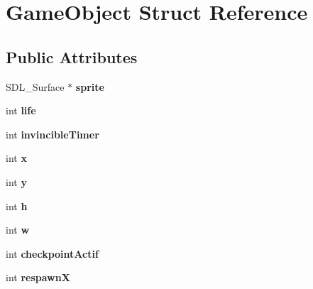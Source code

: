 \hypertarget{structGameObject}{\section{Game\-Object Struct Reference}
\label{structGameObject}
}
\subsection*{Public Attributes}
\begin{DoxyCompactItemize}
\item 
\hypertarget{structGameObject_a4eb15f6633d1197e1799d7ed8143f832}{S\-D\-L\-\_\-\-Surface $\ast$ {\bfseries sprite}}\label{structGameObject_a4eb15f6633d1197e1799d7ed8143f832}

\item 
\hypertarget{structGameObject_ac665b5773c7b861cdf6a9e5a622c94ce}{int {\bfseries life}}\label{structGameObject_ac665b5773c7b861cdf6a9e5a622c94ce}

\item 
\hypertarget{structGameObject_acac388c7f4267c124a662db336a4a5e1}{int {\bfseries invincible\-Timer}}\label{structGameObject_acac388c7f4267c124a662db336a4a5e1}

\item 
\hypertarget{structGameObject_ad35c8c981954a69143edb0fa25ec4693}{int {\bfseries x}}\label{structGameObject_ad35c8c981954a69143edb0fa25ec4693}

\item 
\hypertarget{structGameObject_a23e00e3eff70fc63a5230aad2c19c740}{int {\bfseries y}}\label{structGameObject_a23e00e3eff70fc63a5230aad2c19c740}

\item 
\hypertarget{structGameObject_ac4e6e4da528bb5694d012528ea0df51e}{int {\bfseries h}}\label{structGameObject_ac4e6e4da528bb5694d012528ea0df51e}

\item 
\hypertarget{structGameObject_a886112c395ce593768f0bcaca318dfa6}{int {\bfseries w}}\label{structGameObject_a886112c395ce593768f0bcaca318dfa6}

\item 
\hypertarget{structGameObject_a7b89be1a36f8ad6569173d17c2e91478}{int {\bfseries checkpoint\-Actif}}\label{structGameObject_a7b89be1a36f8ad6569173d17c2e91478}

\item 
\hypertarget{structGameObject_af8275711fee8d3c37f217938344bb019}{int {\bfseries respawn\-X}}\label{structGameObject_af8275711fee8d3c37f217938344bb019}


\end{DoxyCompactItemize}
